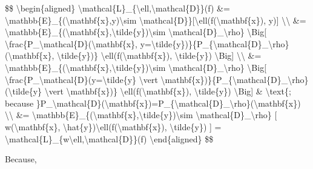\$\$ \textbackslash begin\{aligned\} \textbackslash mathcal\{L\}\_\{\textbackslash ell,\textbackslash mathcal\{D\}\}(f) \&= \textbackslash mathbb\{E\}\_\{(\textbackslash mathbf\{x\},y)\textbackslash sim \textbackslash mathcal\{D\}\}{[}\textbackslash ell(f(\textbackslash mathbf\{x\}), y){]} \textbackslash\textbackslash{} \&= \textbackslash mathbb\{E\}\_\{(\textbackslash mathbf\{x\},\textbackslash tilde\{y\})\textbackslash sim \textbackslash mathcal\{D\}\_\textbackslash rho\} \textbackslash Big{[} \textbackslash frac\{P\_\textbackslash mathcal\{D\}(\textbackslash mathbf\{x\}, y=\textbackslash tilde\{y\})\}\{P\_\{\textbackslash mathcal\{D\}\_\textbackslash rho\}(\textbackslash mathbf\{x\}, \textbackslash tilde\{y\})\} \textbackslash ell(f(\textbackslash mathbf\{x\}), \textbackslash tilde\{y\}) \textbackslash Big{]} \textbackslash\textbackslash{} \&= \textbackslash mathbb\{E\}\_\{(\textbackslash mathbf\{x\},\textbackslash tilde\{y\})\textbackslash sim \textbackslash mathcal\{D\}\_\textbackslash rho\} \textbackslash Big{[} \textbackslash frac\{P\_\textbackslash mathcal\{D\}(y=\textbackslash tilde\{y\} \textbackslash vert \textbackslash mathbf\{x\})\}\{P\_\{\textbackslash mathcal\{D\}\_\textbackslash rho\}(\textbackslash tilde\{y\} \textbackslash vert \textbackslash mathbf\{x\})\} \textbackslash ell(f(\textbackslash mathbf\{x\}), \textbackslash tilde\{y\}) \textbackslash Big{]} \& \textbackslash text\{; because \}P\_\textbackslash mathcal\{D\}(\textbackslash mathbf\{x\})=P\_\{\textbackslash mathcal\{D\}\_\textbackslash rho\}(\textbackslash mathbf\{x\}) \textbackslash\textbackslash{} \&= \textbackslash mathbb\{E\}\_\{(\textbackslash mathbf\{x\},\textbackslash tilde\{y\})\textbackslash sim \textbackslash mathcal\{D\}\_\textbackslash rho\} {[} w(\textbackslash mathbf\{x\}, \textbackslash hat\{y\})\textbackslash ell(f(\textbackslash mathbf\{x\}), \textbackslash tilde\{y\}) {]} = \textbackslash mathcal\{L\}\_\{w\textbackslash ell,\textbackslash mathcal\{D\}\}(f) \textbackslash end\{aligned\} \$\$

Because,

